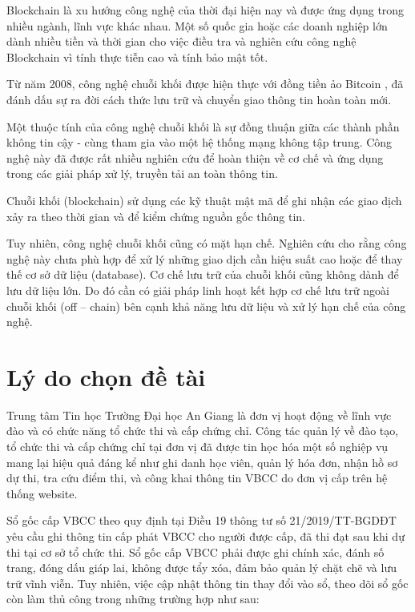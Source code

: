 Blockchain là xu hướng công nghệ của thời đại hiện nay và được ứng dụng trong nhiều ngành, lĩnh vực khác nhau.
Một số quốc gia hoặc các doanh nghiệp lớn dành nhiều tiền và thời gian cho việc điều tra và nghiên cứu công nghệ Blockchain vì tính thực tiễn cao và tính bảo mật tốt.

Từ năm 2008, công nghệ chuỗi khối được hiện thực với đồng tiền ảo Bitcoin \cite{nakamoto2008bitcoin}, đã đánh dấu sự ra đời cách thức lưu trữ và chuyển giao thông tin hoàn toàn mới.

Một thuộc tính của công nghệ chuỗi khối là sự đồng thuận giữa các thành phần không tin cậy - cùng tham gia vào một hệ thống mạng không tập trung. Công nghệ này đã được rất nhiều nghiên cứu \cite{10.1145/3190508.3190538, ANTWI2021100012, fair2019, 8246573, Fang2020} để hoàn thiện về cơ chế và ứng dụng trong các giải pháp xử lý, truyền tải an toàn thông tin.

Chuỗi khối (blockchain) sử dụng các kỹ thuật mật mã \cite{lequyetthang2016, christofpaar2015, ralphcharlesmerkle1979, shannon-otp} để ghi nhận các giao dịch xảy ra theo thời gian và để kiểm chứng nguồn gốc thông tin.

Tuy nhiên, công nghệ chuỗi khối cũng có mặt hạn chế.
Nghiên cứu \cite{CHEN20191122} cho rằng công nghệ này chưa phù hợp để xử lý những giao dịch cần hiệu suất cao hoặc để thay thế cơ sở dữ liệu (database).
Cơ chế lưu trữ của chuỗi khối cũng không dành để lưu dữ liệu lớn.
Do đó cần có giải pháp linh hoạt kết hợp cơ chế lưu trữ ngoài chuỗi khối (off -- chain) bên cạnh khả năng lưu dữ liệu và xử lý hạn chế của công nghệ.

\section{Lý do chọn đề tài}

Trung tâm Tin học Trường Đại học An Giang là đơn vị hoạt động về lĩnh vực đào và có chức năng tổ chức thi và cấp chứng chỉ.
Công tác quản lý về đào tạo, tổ chức thi và cấp chứng chỉ tại đơn vị đã được tin học hóa một số nghiệp vụ mang lại hiệu quả đáng kể như ghi danh học viên, quản lý hóa đơn, nhận hồ sơ dự thi, tra cứu điểm thi, và công khai thông tin VBCC do đơn vị cấp trên hệ thống website.

Sổ gốc cấp VBCC theo quy định tại Điều 19 thông tư số 21/2019/TT-BGDĐT yêu cầu ghi thông tin cấp phát VBCC cho người được cấp, đã thi đạt sau khi dự thi tại cơ sở tổ chức thi. Sổ gốc cấp VBCC phải được ghi chính xác, đánh số trang, đóng dấu giáp lai, không được tẩy xóa, đảm bảo quản lý chặt chẽ và lưu trữ vĩnh viễn. Tuy nhiên, việc cập nhật thông tin thay đổi vào sổ, theo dõi sổ gốc còn làm thủ công trong những trường hợp như sau:

